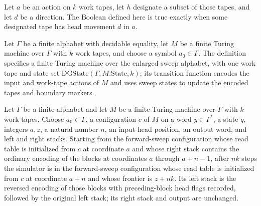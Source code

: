 \begin{definition}
\label{Turing.FinTM.dgCross}
\leanok
{}
Let $a$ be an action on $k$ work tapes, let $h$ designate a subset of those tapes, and
let $d$ be a direction. The Boolean defined here is true exactly when some designated
tape has head movement $d$ in $a$.
\end{definition}

\begin{definition}
\label{Turing.FinTM.dgTM}
\leanok
{}
Let $\Gamma$ be a finite alphabet with decidable equality, let $M$ be a finite Turing
machine over $\Gamma$ with $k$ work tapes, and choose a symbol $a_0\in\Gamma$. The
definition specifies a finite Turing machine over the enlarged sweep alphabet, with one
work tape and state set $\mathrm{DGState}(\Gamma,M.\mathrm{State},k)$; its transition
function encodes the input and work-tape actions of $M$ and uses sweep states to update
the encoded tapes and boundary markers.
\end{definition}

\begin{lemma}
\label{Turing.FinTM.dg_read}
\leanok
{}
Let $\Gamma$ be a finite alphabet and let $M$ be a finite Turing machine over $\Gamma$
with $k$ work tapes. Choose $a_0\in\Gamma$, a configuration $c$ of $M$ on a word
$y\in\Gamma^*$, a state $q$, integers $a,z$, a natural number $n$, an input-head
position, an output word, and left and right stacks. Starting from the forward-sweep
configuration whose read table is initialized from $c$ at coordinate $a$ and whose right
stack contains the ordinary encoding of the blocks at coordinates $a$ through $a+n-1$,
after $nk$ steps the simulator is in the forward-sweep configuration whose read table is
initialized from $c$ at coordinate $a+n$ and whose frontier is $z+nk$. Its left stack is
the reversed encoding of those blocks with preceding-block head flags recorded, followed
by the original left stack; its right stack and output are unchanged.
\end{lemma}


